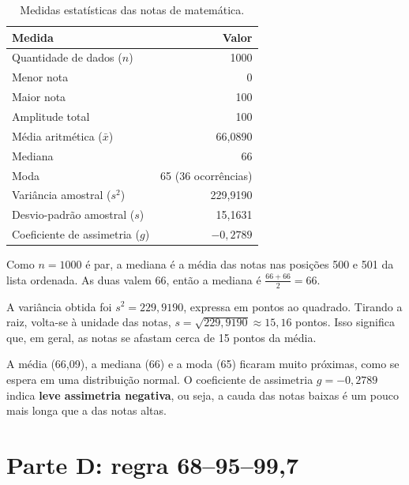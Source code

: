 \documentclass[12pt,a4paper]{article}
\begin{document}
\begin{table}[H]
  \centering
  \caption{Medidas estatísticas das notas de matemática.}
  \label{tab:medidas}
  \begin{tabular}{l r}
    \toprule
    \textbf{Medida} & \textbf{Valor} \\
    \midrule
    Quantidade de dados ($n$)          & 1000 \\
    Menor nota                         & 0 \\
    Maior nota                         & 100 \\
    Amplitude total                    & 100 \\
    Média aritmética ($\bar{x}$)       & 66,0890 \\
    Mediana                            & 66 \\
    Moda                               & 65 (36 ocorrências) \\
    Variância amostral ($s^2$)         & 229,9190 \\
    Desvio-padrão amostral ($s$)       & 15,1631 \\
    Coeficiente de assimetria ($g$)    & $-0{,}2789$ \\
    \bottomrule
  \end{tabular}
\end{table}

\begin{exemplo}
Como $n = 1000$ é par, a mediana é a média das notas nas posições 500 e 501 da lista ordenada. As duas valem 66, então a mediana é $\frac{66+66}{2} = 66$.

A variância obtida foi $s^2 = 229{,}9190$, expressa em pontos ao quadrado. Tirando a raiz, volta-se à unidade das notas, $s = \sqrt{229{,}9190} \approx 15{,}16$ pontos. Isso significa que, em geral, as notas se afastam cerca de 15 pontos da média.
\end{exemplo}

A média (66,09), a mediana (66) e a moda (65) ficaram muito próximas, como se espera em uma distribuição normal. O coeficiente de assimetria $g=-0{,}2789$ indica \textbf{leve assimetria negativa}, ou seja, a cauda das notas baixas é um pouco mais longa que a das notas altas.

\section{Parte D: regra 68--95--99,7}\label{sec:d}
\end{document}
